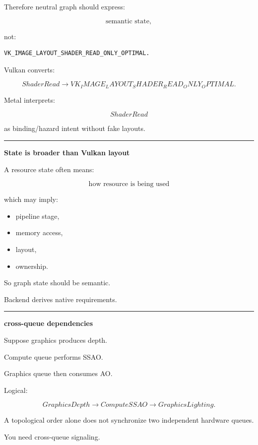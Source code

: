 Therefore neutral graph should express:

\[
\text{semantic state},
\]

not:

\begin{verbatim}
VK_IMAGE_LAYOUT_SHADER_READ_ONLY_OPTIMAL.
\end{verbatim}

Vulkan converts:

\[
ShaderRead
\rightarrow
VK_IMAGE_LAYOUT_SHADER_READ_ONLY_OPTIMAL.
\]

Metal interprets:

\[
ShaderRead
\]

as binding/hazard intent without fake layouts.

\begin{center}\rule{0.5\linewidth}{0.5pt}\end{center}

\textbf{State is broader than Vulkan layout}

A resource state often means:

\[
\boxed{
\text{how resource is being used}
}
\]

which may imply:

\begin{itemize}
\tightlist
\item
  pipeline stage,
\item
  memory access,
\item
  layout,
\item
  ownership.
\end{itemize}

So graph state should be semantic.

Backend derives native requirements.

\begin{center}\rule{0.5\linewidth}{0.5pt}\end{center}

\textbf{cross-queue dependencies}

Suppose graphics produces depth.

Compute queue performs SSAO.

Graphics queue then consumes AO.

Logical:

\[
GraphicsDepth
\rightarrow
ComputeSSAO
\rightarrow
GraphicsLighting.
\]

A topological order alone does not synchronize two independent hardware queues.

You need cross-queue signaling.

